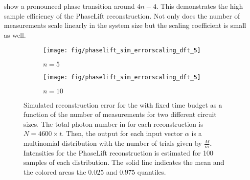 show a pronounced phase transition around $4n - 4$.
This demonstrates the high sample efficiency of the PhaseLift reconstruction.
Not only does the number of measurements scale linearly in the system size but the scaling coefficient is small as well.\\

\begin{figure*}[tbp]
  \begin{subfigure}{.475\columnwidth}
    \texttt{[image: fig/phaselift\_sim\_errorscaling\_dft\_5]}
    \caption{\label{sfig:pl.simerror.five}%
      $n = 5$
    }
   \end{subfigure}
  \begin{subfigure}{.475\columnwidth}
    \texttt{[image: fig/phaselift\_sim\_errorscaling\_dft\_5]}
    \caption{\label{sfig:pl.simerror.ten}%
      $n = 10$
    }
   \end{subfigure}
  \caption{\label{fig:pl.simerror}%
    Simulated reconstruction error for the with fixed time budget as a function of the number of measurements for two different circuit sizes.
    The total photon number in for each reconstruction is $N = 4600 \times t$.
    Then, the output for each input vector $\alpha$ is a multinomial distribution with the number of trials given by $\frac{M}{m}$.
    Intensities for the PhaseLift reconstruction is estimated for 100 samples of each distribution.
    The solid line indicates the mean and the colored areas the $0.025$ and $0.975$ quantiles.
  }
\end{figure*}


